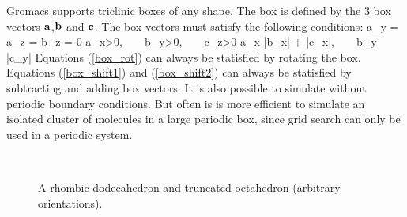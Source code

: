 Gromacs supports triclinic boxes of any shape.
The box is defined by the 3 box vectors ${\bf a}$,${\bf b}$ and ${\bf c}$.
The box vectors must satisfy the following conditions:
\beq
\label{box_rot}
a_y = a_z = b_z = 0
\eeq
\beq
\label{box_shift1}
a_x>0,~~~~b_y>0,~~~~c_z>0
\eeq
\beq
\label{box_shift2}
a_x \geq |b_x| + |c_x|,~~~~b_y \geq |c_y|
\eeq
Equations (\ref{box_rot}) can always be statisfied by rotating the box.
Equations (\ref{box_shift1}) and (\ref{box_shift2}) can always be
statisfied by subtracting and adding box vectors.
It is also possible to simulate without periodic boundary conditions.
But often is is more efficient to simulate an isolated cluster of molecules
in a large periodic box, since grid search can only be used in a periodic
system.

\begin{figure}
\centerline{
~~~~
}
\caption {A rhombic dodecahedron and truncated octahedron
(arbitrary orientations).}
\label{fig:boxshapes}
\end{figure}

